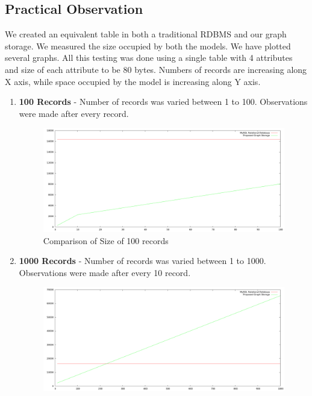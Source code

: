 \documentclass[12pt, oneside]{book}
\begin{document}
\subsection{Practical Observation}
We created an equivalent table in both a traditional RDBMS and our graph storage. We measured the size occupied by both the models. We have plotted several graphs. All this testing was done using a single table with 4 attributes and size of each attribute to be 80 bytes. Numbers of records are increasing along X axis, while space occupied by the model is increasing along Y axis.
\begin{enumerate}
 \item \textbf{100 Records} - Number of records was varied between 1 to 100. Observations were made after every record.
 \begin{figure}[H]
  \begin{center}
   \includegraphics[width=\textwidth]{pics/100.png}
   \caption{Comparison of Size of 100 records}
   \label{100pic}
  \end{center}
 \end{figure}
\item \textbf{1000 Records} - Number of records was varied between 1 to 1000. Observations were made after every 10 record.
 \begin{figure}[H]
  \begin{center}
   \includegraphics[width=\textwidth]{pics/1000.png}

\end{center}
\end{figure}
\end{enumerate}
\end{document}
